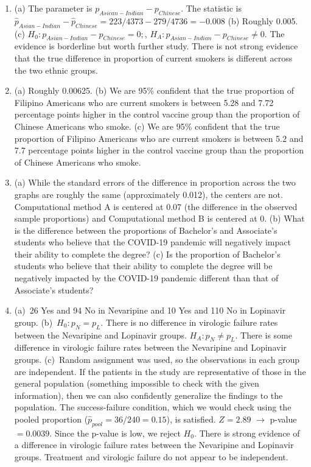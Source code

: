 \documentclass[
  10pt,
  openany]{book}
\providecommand{\tightlist}{%
  \setlength{\itemsep}{0pt}\setlength{\parskip}{0pt}}
\begin{document}
\begin{enumerate}
\def\labelenumi{\arabic{enumi}.}
\tightlist
\item
  (a) The parameter is \(p_{Asican-Indian} - p_{Chinese}.\) The statistic is \(\hat{p}_{Asian-Indian} - \hat{p}_{Chinese} = 223/4373 - 279/4736 = -0.008\) (b) Roughly 0.005. (c) \(H_0: p_{Asian-Indian} - p_{Chinese} = 0;\), \(H_A: p_{Asian-Indian} - p_{Chinese} \ne 0.\) The evidence is borderline but worth further study. There is not strong evidence that the true difference in proportion of current smokers is different across the two ethnic groups.

  \addtocounter{enumi}{1}
\item
  (a) Roughly 0.00625. (b) We are 95\% confident that the true proportion of Filipino Americans who are current smokers is between 5.28 and 7.72 percentage points higher in the control vaccine group than the proportion of Chinese Americans who smoke. (c) We are 95\% confident that the true proportion of Filipino Americans who are current smokers is between 5.2 and 7.7 percentage points higher in the control vaccine group than the proportion of Chinese Americans who smoke.

  \addtocounter{enumi}{1}
\item
  (a) While the standard errors of the difference in proportion across the two graphs are roughly the same (approximately 0.012), the centers are not. Computational method A is centered at 0.07 (the difference in the observed sample proportions) and Computational method B is centered at 0. (b) What is the difference between the proportions of Bachelor's and Associate's students who believe that the COVID-19 pandemic will negatively impact their ability to complete the degree? (c) Is the proportion of Bachelor's students who believe that their ability to complete the degree will be negatively impacted by the COVID-19 pandemic different than that of Associate's students?

  \addtocounter{enumi}{1}
\item
  (a)~26 Yes and 94 No in Nevaripine and 10 Yes and 110 No in Lopinavir group. (b)~\(H_0: p_N = p_L\). There is no difference in virologic failure rates between the Nevaripine and Lopinavir groups. \(H_A: p_N \ne p_L\). There is some difference in virologic failure rates between the Nevaripine and Lopinavir groups. (c)~Random assignment was used, so the observations in each group are independent. If the patients in the study are representative of those in the general population (something impossible to check with the given information), then we can also confidently generalize the findings to the population. The success-failure condition, which we would check using the pooled proportion (\(\hat{p}_{pool} = 36/240 = 0.15\)), is satisfied. \(Z = 2.89\) \(\to\) p-value \(=0.0039\). Since the p-value is low, we reject \(H_0\). There is strong evidence of a difference in virologic failure rates between the Nevaripine and Lopinavir groups. Treatment and virologic failure do not appear to be independent.


\end{enumerate}
\end{document}
